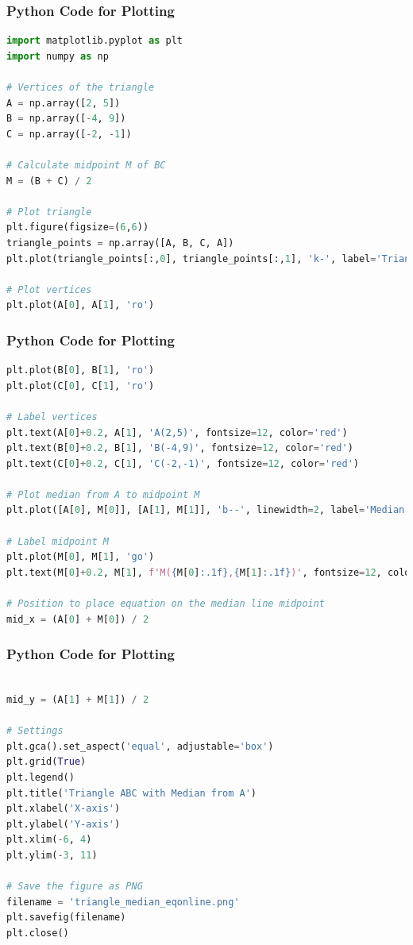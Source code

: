\documentclass{beamer}
\theoremstyle{remark}
\numberwithin{equation}{section}
\begin{document}
\begin{frame}[fragile]
\frametitle{Python Code for Plotting}
\begin{lstlisting}[language=Python]
import matplotlib.pyplot as plt
import numpy as np

# Vertices of the triangle
A = np.array([2, 5])
B = np.array([-4, 9])
C = np.array([-2, -1])

# Calculate midpoint M of BC
M = (B + C) / 2

# Plot triangle
plt.figure(figsize=(6,6))
triangle_points = np.array([A, B, C, A])
plt.plot(triangle_points[:,0], triangle_points[:,1], 'k-', label='Triangle ABC')

# Plot vertices
plt.plot(A[0], A[1], 'ro')

\end{lstlisting}

\end{frame}
\begin{frame}[fragile]
\frametitle{Python Code for Plotting}
\begin{lstlisting}[language=Python]
plt.plot(B[0], B[1], 'ro')
plt.plot(C[0], C[1], 'ro')

# Label vertices
plt.text(A[0]+0.2, A[1], 'A(2,5)', fontsize=12, color='red')
plt.text(B[0]+0.2, B[1], 'B(-4,9)', fontsize=12, color='red')
plt.text(C[0]+0.2, C[1], 'C(-2,-1)', fontsize=12, color='red')

# Plot median from A to midpoint M
plt.plot([A[0], M[0]], [A[1], M[1]], 'b--', linewidth=2, label='Median AM')

# Label midpoint M
plt.plot(M[0], M[1], 'go')
plt.text(M[0]+0.2, M[1], f'M({M[0]:.1f},{M[1]:.1f})', fontsize=12, color='green')

# Position to place equation on the median line midpoint
mid_x = (A[0] + M[0]) / 2

\end{lstlisting}

\end{frame}
\begin{frame}[fragile]
\frametitle{Python Code for Plotting}
\begin{lstlisting}[language=Python]

mid_y = (A[1] + M[1]) / 2

# Settings
plt.gca().set_aspect('equal', adjustable='box')
plt.grid(True)
plt.legend()
plt.title('Triangle ABC with Median from A')
plt.xlabel('X-axis')
plt.ylabel('Y-axis')
plt.xlim(-6, 4)
plt.ylim(-3, 11)

# Save the figure as PNG
filename = 'triangle_median_eqonline.png'
plt.savefig(filename)
plt.close()
\end{lstlisting}

\end{frame}
\end{document}
